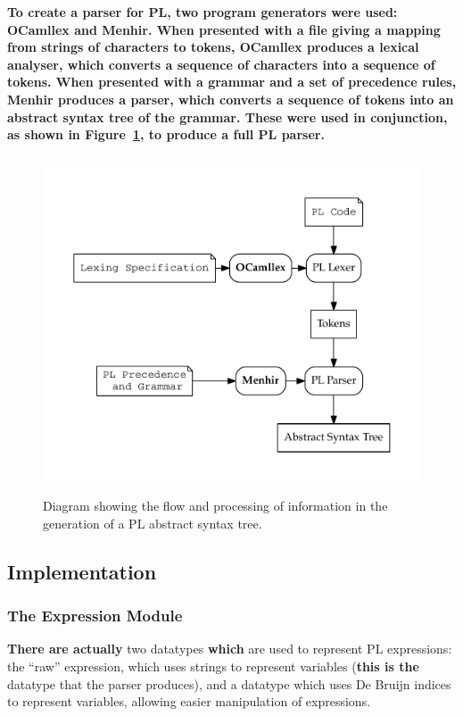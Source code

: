 \documentclass[12pt,a4paper,twoside,openright]{report}
\begin{document}
\textbf{To create a parser for PL, two program generators were used:
OCamllex and Menhir. When presented with a
file giving a mapping from strings of characters to tokens,
OCamllex produces a lexical analyser, which converts a sequence
of characters into a sequence of tokens. When presented with a
grammar and a set of precedence rules, Menhir produces a parser,
which converts a sequence of tokens into an abstract syntax tree
of the grammar. These were used in conjunction, as shown in
Figure~\ref{fig:parsing}, to produce a full PL parser.}

\begin{figure}
	\centering
	\includegraphics[height=10cm]{parsing}
	\caption{Diagram showing the flow and processing of
		information in the generation of a PL abstract
		syntax tree.}
	\label{fig:parsing}
\end{figure}

\subsection{Implementation}

\subsubsection{The Expression Module}
\textbf{There are actually} two datatypes \textbf{which} are used to
represent PL expressions: the ``raw'' expression, which
uses strings to represent variables (\textbf{this is the}
datatype that the parser produces), and a datatype
which uses De Bruijn indices \cite{debr72} to
represent variables, allowing
easier manipulation of expressions.
\end{document}
